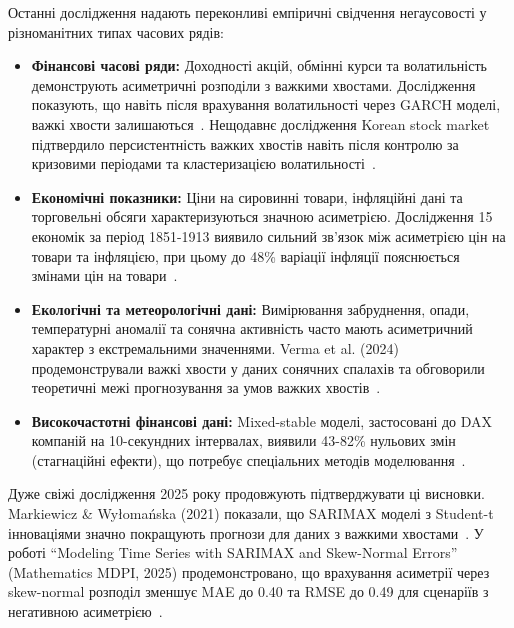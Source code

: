 \documentclass[12pt,a4paper]{article}
\begin{document}
Останні дослідження надають переконливі емпіричні свідчення негаусовості у різноманітних типах часових рядів:

\begin{itemize}
    \item \textbf{Фінансові часові ряди:} Доходності акцій, обмінні курси та волатильність демонструють асиметричні розподіли з важкими хвостами. Дослідження показують, що навіть після врахування волатильності через GARCH моделі, важкі хвости залишаються~\cite{viswanathan2003quantifying,kim2012approximation}. Нещодавнє дослідження Korean stock market підтвердило персистентність важких хвостів навіть після контролю за кризовими періодами та кластеризацією волатильності~\cite{kim2019fat}.

    \item \textbf{Економічні показники:} Ціни на сировинні товари, інфляційні дані та торговельні обсяги характеризуються значною асиметрією. Дослідження 15 економік за період 1851-1913 виявило сильний зв'язок між асиметрією цін на товари та інфляцією, при цьому до 48\% варіації інфляції пояснюється змінами цін на товари~\cite{jacks2024commodity}.

    \item \textbf{Екологічні та метеорологічні дані:} Вимірювання забруднення, опади, температурні аномалії та сонячна активність часто мають асиметричний характер з екстремальними значеннями. Verma et al. (2024) продемонстрували важкі хвости у даних сонячних спалахів та обговорили теоретичні межі прогнозування за умов важких хвостів~\cite{verma2024optimal}.

    \item \textbf{Високочастотні фінансові дані:} Mixed-stable моделі, застосовані до DAX компаній на 10-секундних інтервалах, виявили 43-82\% нульових змін (стагнаційні ефекти), що потребує спеціальних методів моделювання~\cite{slezak2023application,dedomenico2023modeling}.
\end{itemize}

Дуже свіжі дослідження 2025 року продовжують підтверджувати ці висновки. Markiewicz \& Wyłomańska (2021) показали, що SARIMAX моделі з Student-t інноваціями значно покращують прогнози для даних з важкими хвостами~\cite{markiewicz2021time}. У роботі ``Modeling Time Series with SARIMAX and Skew-Normal Errors'' (Mathematics MDPI, 2025) продемонстровано, що врахування асиметрії через skew-normal розподіл зменшує MAE до 0.40 та RMSE до 0.49 для сценаріїв з негативною асиметрією~\cite{saraiva2025modeling}.
\end{document}

